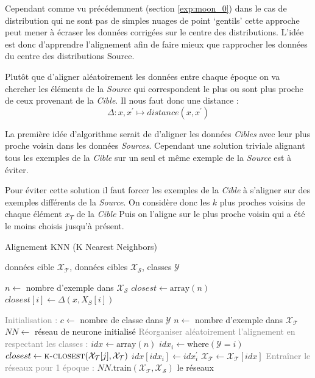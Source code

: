 Cependant comme vu précédemment (section \ref{exp:moon_0}) dans le cas de
distribution qui ne sont pas de simples nuages de point `gentils' cette approche 
peut mener à écraser les données corrigées sur le centre des distributions.
L'idée est donc d'apprendre l'alignement afin de faire mieux que rapprocher les
données du centre des distributions Source.

Plutôt que d'aligner aléatoirement les données entre chaque époque on va chercher
les éléments de la \emph{Source} qui correspondent le plus ou sont plus proche de 
ceux provenant de la \emph{Cible}. Il nous faut donc une distance : 
$$ \Delta : x, x^\prime \mapsto distance(x, x^\prime)$$

La première idée d'algorithme serait de d'aligner les données \emph{Cibles} avec leur
plus proche voisin dans les données \emph{Sources}. Cependant une solution triviale
alignant tous les exemples de la \emph{Cible} sur un seul et même exemple de la 
\emph{Source} est à éviter.

Pour éviter cette solution il faut forcer les exemples de la \emph{Cible} à s'aligner 
sur des exemples différents de la \emph{Source}.
On considère donc les $k$ plus proches voisins de chaque élément $x_T$ de la \emph{Cible}
Puis on l'aligne sur le plus proche voisin qui a été le moins choisis jusqu'à présent.


\begin{algorithm}[tb]
   \caption{Alignement KNN (K Nearest Neighbors)}
   \label{alg:align_KNN}
\begin{algorithmic}
     données cible $\mathcal{X_T}$, données cibles $\mathcal{X_S}$, classes $\mathcal{Y}$
    
    \State $n \gets $ nombre d'exemple dans $\mathcal{X_S}$
    \State $closest \gets \text{array}(n)$
        \State $closest[i] \gets \Delta(x, X_S[i])$
    \EndFor           
    \EndFunction

    \State \textcolor{gray}{Initialisation :}
    \State $c \gets $ nombre de classe dans $\mathcal{Y}$
    \State $n \gets $ nombre d'exemple dans $\mathcal{X_T}$
    \State $NN \gets$ réseau de neurone initialisé
        \State \textcolor{gray}{Réorganiser aléatoirement l'alignement en respectant les classes :}
        \State $idx \gets \text{array}(n)$
            \State $idx_i \gets \text{where}(\mathcal{Y}=i)$
                \State $closest \gets \textsc{k-closest}(\mathcal{X_T}[j], \mathcal{X_T})$
            \EndFor
            \State $idx[idx_i]\gets idx_i^\prime$
        \EndFor
        \State $\mathcal{X_T} \gets \mathcal{X_T}[idx]$
        \State \textcolor{gray}{Entraîner le réseaux pour 1 époque :}
        \State $NN.\text{train}(\mathcal{X_T}, \mathcal{X_S})$
    \EndWhile
     le réseaux
\end{algorithmic}
\end{algorithm}



